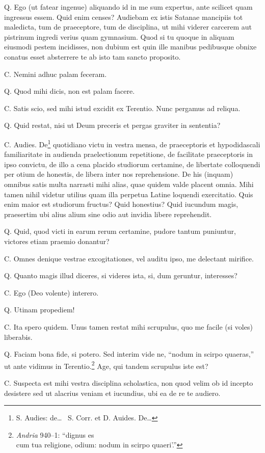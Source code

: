 \documentclass{article}
\begin{document}
Q. Ego (ut fatear ingenue) aliquando id in me sum expertus, ante scilicet quam ingressus essem. Quid enim censes? Audiebam ex istis Satanae mancipiis tot maledicta, tum de praeceptore, tum de disciplina, ut mihi viderer carcerem aut pistrinum ingredi verius quam gymnasium. Quod si tu quoque in aliquam eiusmodi pestem incidisses, non dubium est quin ille manibus pedibusque obnixe conatus esset absterrere te ab isto tam sancto proposito.

C. Nemini adhuc palam feceram.

Q. Quod mihi dicis, non est palam facere.

C. Satis scio, sed mihi istud excidit ex Terentio. Nunc pergamus ad reliqua.

Q. Quid restat, nisi ut Deum preceris et pergas graviter in sententia? 

C. Audies. De\footnote{S. Audies: de\ldots~ S. Corr. et  D. Auides. De\ldots} quotidiano victu in vestra mensa, de praeceptoris et hypodidascali familiaritate in audienda praelectionum repetitione, de facilitate praeceptoris in ipso convictu, de illo a cena placido studiorum certamine, de libertate colloquendi per otium de honestis, de libera inter nos reprehensione. De his (inquam) omnibus satis multa narrasti mihi alias, quae quidem valde placent omnia. Mihi tamen nihil videtur utilius quam illa perpetua Latine loquendi exercitatio. Quis enim maior est studiorum fructus? Quid honestius? Quid iucundum magis, praesertim ubi alius alium sine odio aut invidia libere reprehendit.

Q. Quid, quod victi in earum rerum certamine, pudore tantum puniuntur, victores etiam praemio donantur?

C. Omnes denique vestrae excogitationes, vel auditu ipso, me delectant mirifice.

Q. Quanto magis illud diceres, si videres ista, si, dum geruntur, interesses?

C. Ego (Deo volente) interero.

Q. Utinam propediem!

C. Ita spero quidem. Unus tamen restat mihi scrupulus, quo me facile (si voles) liberabis.

Q. Faciam bona fide, si potero. Sed interim vide ne, ``nodum in scirpo quaeras,'' ut ante vidimus in Terentio.\footnote{\emph{Andria} 940--1: ``dignus es
\\cum tua religione, odium: nodum in scirpo quaeri'.''} Age, qui tandem scrupulus iste est?

C. Suspecta est mihi vestra disciplina scholastica, non quod velim ob id incepto desistere sed ut alacrius veniam et iucundius, ubi ea de re te audiero.
\end{document}
